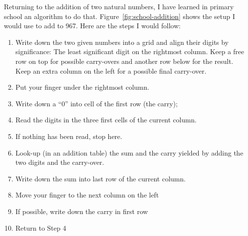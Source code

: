 \documentclass{aldast}
\begin{document}
Returning to the addition of two natural numbers, I have learned in
primary school an algorithm to do
that. Figure~\ref{fig:school-addition} shows the setup I would use to
add  to 967. Here are the steps I would follow:
\begin{enumerate}
\item Write down the two given numbers into a grid and align their
  digits by significance: The least significant digit on the rightmost
  column. Keep a free row on top for possible carry-overs and
  another row below for the result. Keep an extra column on
  the left for a possible final carry-over.
\item Put your finger under the rightmost column.
\item Write down a ``0'' into cell of the first row (the carry);
\item Read the digits in the three first cells of the current column.
\item If nothing has been read, stop here.
\item Look-up (in an addition table) the sum and the carry yielded by
  adding the two digits and the carry-over.
\item Write down the sum into last row of the current column.
\item Move your finger to the next column on the left
\item If possible, write down the carry in first row
\item Return to Step 4
\end{enumerate}
\end{document}

